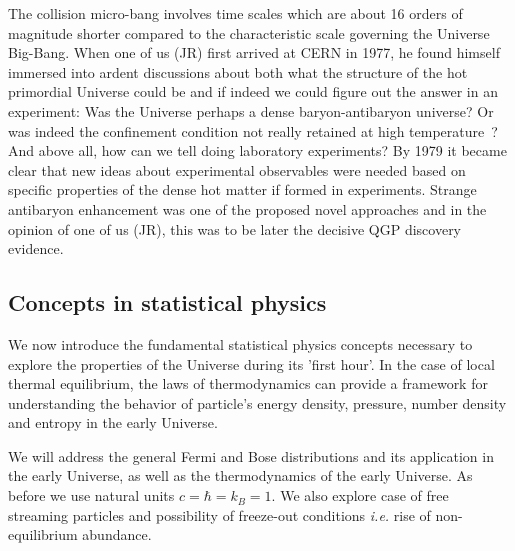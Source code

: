 {The collision micro-bang involves time scales which are about 16 orders of magnitude shorter compared to the characteristic scale governing the Universe Big-Bang. When one of us (JR) first arrived at CERN in 1977, he found himself immersed into ardent discussions about both what the structure of the hot primordial Universe could be and if indeed we could figure out the answer in an experiment: Was the Universe  perhaps a dense baryon-antibaryon universe? Or was indeed the confinement condition not really retained at high temperature~\cite{Weinberg:1974hy,Harrington:1974fc,Cabibbo:1975ig}? And above all, how can we tell doing laboratory experiments? By 1979 it became clear that new ideas about experimental observables were needed based on specific properties of the dense hot matter if formed in experiments. Strange antibaryon enhancement was one of the proposed novel approaches and in the opinion of one of us (JR), this was to be later the decisive QGP discovery evidence.

\subsection{Concepts in statistical physics} \label{sec:statphys}
We now introduce the fundamental statistical physics concepts necessary to explore the properties of the Universe during its 'first hour'. In the case of local thermal equilibrium, the laws of thermodynamics can provide a framework for understanding the behavior of particle's energy density, pressure, number density and entropy in the early Universe.

We will address the general Fermi and Bose distributions and its application in the early Universe, as well as the thermodynamics of the early Universe. As before we use natural units $c=\hbar=k_{B}=1$. We also explore case of free streaming particles and possibility of freeze-out conditions {\it i.e.\/} rise of non-equilibrium abundance.

}
